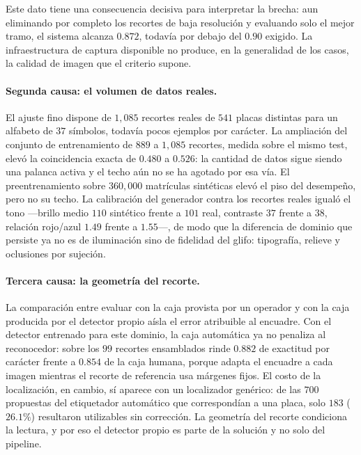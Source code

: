 Este dato tiene una consecuencia decisiva para interpretar la brecha: aun
eliminando por completo los recortes de baja resolución y evaluando solo el mejor
tramo, el sistema alcanza $0{.}872$, todavía por debajo del $0{.}90$ exigido. La
infraestructura de captura disponible no produce, en la generalidad de los casos,
la calidad de imagen que el criterio supone.

\paragraph{Segunda causa: el volumen de datos reales.}
El ajuste fino dispone de $1{,}085$ recortes reales de $541$ placas distintas para
un alfabeto de $37$ símbolos, todavía pocos ejemplos por carácter. La ampliación
del conjunto de entrenamiento de $889$ a $1{,}085$ recortes, medida sobre el mismo
test, elevó la coincidencia exacta de $0{.}480$ a $0{.}526$: la cantidad de datos
sigue siendo una palanca activa y el techo aún no se ha agotado por esa vía. El
preentrenamiento sobre $360{,}000$ matrículas sintéticas elevó el piso del
desempeño, pero no su techo. La calibración del generador contra los recortes
reales igualó el tono ---brillo medio $110$ sintético frente a $101$ real,
contraste $37$ frente a $38$, relación rojo/azul $1{.}49$ frente a $1{.}55$---,
de modo que la diferencia de dominio que persiste ya no es de iluminación sino de
fidelidad del glifo: tipografía, relieve y oclusiones por sujeción.

\paragraph{Tercera causa: la geometría del recorte.}
La comparación entre evaluar con la caja provista por un operador y con la caja
producida por el detector propio aísla el error atribuible al encuadre. Con el
detector entrenado para este dominio, la caja automática ya no penaliza al
reconocedor: sobre los $99$ recortes ensamblados rinde $0{.}882$ de exactitud por
carácter frente a $0{.}854$ de la caja humana, porque adapta el encuadre a cada
imagen mientras el recorte de referencia usa márgenes fijos. El costo de la
localización, en cambio, sí aparece con un localizador genérico: de las $700$
propuestas del etiquetador automático que correspondían a una placa, solo $183$
($26{.}1\%$) resultaron utilizables sin corrección. La geometría del recorte
condiciona la lectura, y por eso el detector propio es parte de la solución y no
solo del pipeline.

